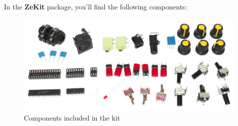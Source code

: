 \documentclass{scrartcl}
\begin{document}
In the \textbf{ZeKit} package, you'll find the following components:
\vspace{-0.25cm}

\begin{figure}[!ht]
    \begin{center}
        \includegraphics[scale=0.32]{assets/zekit-content.jpg}
        \caption{Components included in the kit}
    \end{center}
\end{figure}

\vspace{0.25cm}
\end{document}
